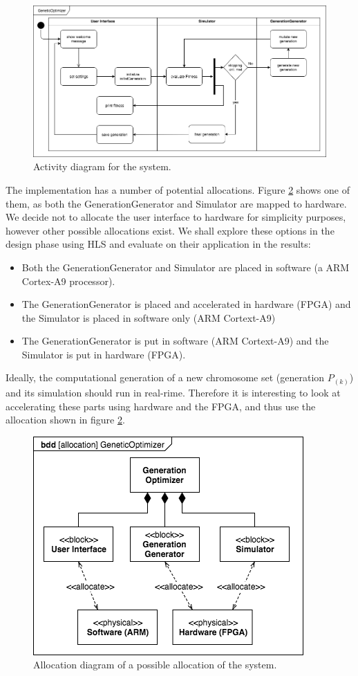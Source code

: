 \begin{figure}[h!]
	\centering
	\includegraphics[width=0.9\linewidth]{../diagrams/overallActivity.png}
	\caption{Activity diagram for the system.}
	\label{fig:activity}
\end{figure}

The implementation has a number of potential allocations. Figure \ref{fig:allocation} shows one of them, as both the GenerationGenerator and Simulator are mapped to hardware. We decide not to allocate the user interface to hardware for simplicity purposes, however other possible allocations exist. We shall explore these options in the design phase using HLS and evaluate on their application in the results:

\begin{itemize} 
	\item Both the GenerationGenerator and Simulator are placed in software (a ARM Cortex-A9 processor).
	\item The GenerationGenerator is placed and accelerated in hardware (FPGA) and the Simulator is placed in software only (ARM Cortext-A9)
	\item The GenerationGenerator is put in software (ARM Cortext-A9) and the Simulator is put in hardware (FPGA).
\end{itemize}

Ideally, the computational generation of a new chromosome set (generation $P_{(k)}$) and its simulation should run in real-rime. Therefore it is interesting to look at accelerating these parts using hardware and the FPGA, and thus use the allocation shown in figure \ref{fig:allocation}.

\begin{figure}[h!]
	\centering
	\includegraphics[width=0.6\linewidth]{../diagrams/allocation.png}
	\caption{Allocation diagram of a possible allocation of the system.}
	\label{fig:allocation}
\end{figure}

